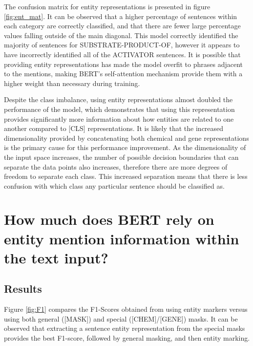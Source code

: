 \documentclass{l4proj}
\begin{document}
\newpage
The confusion matrix for entity representations is presented in figure \ref{fig:ent_mat}. It can be observed that a higher percentage of sentences within each category are correctly classified, and that there are fewer large percentage values falling outside of the main diagonal. This model correctly identified the majority of sentences for SUBSTRATE-PRODUCT-OF, however it appears to have incorrectly identified all of the ACTIVATOR sentences. It is possible that providing entity representations has made the model overfit to phrases adjacent to the mentions, making BERT's self-attention mechanism provide them with a higher weight than necessary during training.

Despite the class imbalance, using entity representations almost doubled the performance of the model, which demonstrates that using this representation provides significantly more information about how entities are related to one another compared to [CLS] representations. It is likely that the increased dimensionality provided by concatenating both chemical and gene representations is the primary cause for this performance improvement. As the dimensionality of the input space increases, the number of possible decision boundaries that can separate the data points also increases, therefore there are more degrees of freedom to separate each class. This increased separation means that there is less confusion with which class any particular sentence should be classified as.

\section{How much does BERT rely on entity mention information within the text input?}

\subsection{Results}

Figure \ref{fig:F1} compares the F1-Scores obtained from using entity markers versus using both general ([MASK]) and special ([CHEM]/[GENE]) masks. It can be observed that extracting a sentence entity representation from the special masks provides the best F1-score, followed by general masking, and then entity marking.  
\end{document}
